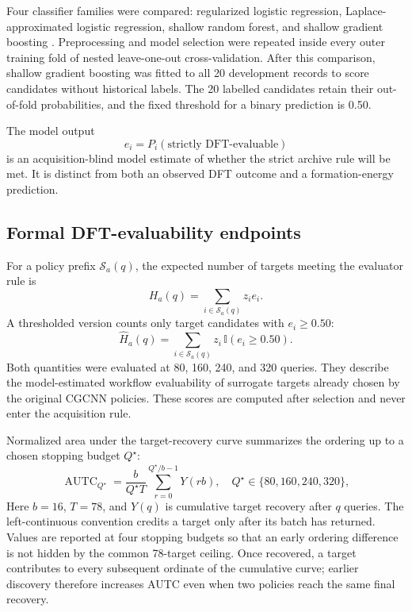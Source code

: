 Four classifier families were compared: regularized logistic regression,
Laplace-approximated logistic regression, shallow random forest, and shallow
gradient boosting \cite{ref-randomforest,ref-gradientboosting,ref-sklearn}.
Preprocessing and model selection were repeated inside every outer training
fold of nested leave-one-out cross-validation. After this comparison, shallow
gradient boosting was fitted to all 20 development records to score candidates
without historical labels. The 20 labelled candidates retain their out-of-fold
probabilities, and the fixed threshold for a binary prediction is 0.50.

The model output
\begin{equation}
e_i=P_i(\text{strictly DFT-evaluable})
\label{eq:evaluable-prob}
\end{equation}
is an acquisition-blind model estimate of whether the strict archive rule will
be met. It is distinct from both an observed DFT outcome and a formation-energy
prediction.

\subsection{Formal DFT-evaluability endpoints}

For a policy prefix $\mathcal{S}_a(q)$, the expected number of targets meeting
the evaluator rule is
\begin{equation}
H_a(q)=\sum_{i\in\mathcal{S}_a(q)} z_i e_i .
\label{eq:evaluability-expected}
\end{equation}
A thresholded version counts only target candidates with $e_i\geq0.50$:
\begin{equation}
\widehat{H}_a(q)=
\sum_{i\in\mathcal{S}_a(q)}
z_i\,\mathbb{I}(e_i\ge 0.50).
\label{eq:evaluability-thresholded}
\end{equation}
Both quantities were evaluated at 80, 160, 240, and 320 queries. They describe
the model-estimated workflow evaluability of surrogate targets already chosen
by the original CGCNN policies. These scores are computed after selection and
never enter the acquisition rule.

Normalized area under the target-recovery curve summarizes the ordering up to a
chosen stopping budget $Q^\star$:
\begin{equation}
\operatorname{AUTC}_{Q^\star}=
\frac{b}{Q^\star T}\sum_{r=0}^{Q^\star/b-1}Y(rb),
\quad Q^\star\in\{80,160,240,320\},
\label{eq:autc}
\end{equation}
Here $b=16$, $T=78$, and $Y(q)$ is cumulative target recovery after $q$
queries. The left-continuous convention credits a target only after its batch
has returned. Values are reported at four stopping budgets so that an early
ordering difference is not hidden by the common 78-target ceiling. Once
recovered, a target contributes to every subsequent ordinate of the cumulative
curve; earlier discovery therefore increases AUTC even when two policies reach
the same final recovery.


